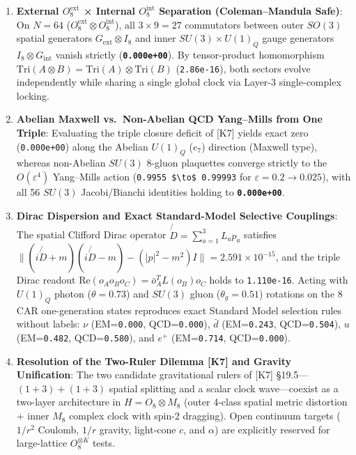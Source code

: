 \documentclass[
  a4paper,
]{article}
\providecommand{\tightlist}{%
  \setlength{\itemsep}{0pt}\setlength{\parskip}{0pt}}
\begin{document}
\begin{enumerate}
\def\labelenumi{\arabic{enumi}.}
\tightlist
\item
  \textbf{External \(O_8^{\mathrm{ext}}\) × Internal
  \(O_8^{\mathrm{int}}\) Separation (Coleman--Mandula Safe)}: On
  \(N = 64\) (\(O_8^{\mathrm{ext}} \otimes O_8^{\mathrm{int}}\)), all
  \(3 \times 9 = 27\) commutators between outer \(SO(3)\) spatial
  generators \(G_{\mathrm{ext}}\otimes I_8\) and inner
  \(SU(3)\times U(1)_Q\) gauge generators
  \(I_8\otimes G_{\mathrm{int}}\) vanish strictly
  (\textbf{\texttt{0.000e+00}}). By tensor-product homomorphism
  \(\mathrm{Tri}(A\otimes B) = \mathrm{Tri}(A)\otimes\mathrm{Tri}(B)\)
  (\texttt{2.86e-16}), both sectors evolve independently while sharing a
  single global clock via Layer-3 single-complex locking.
\item
  \textbf{Abelian Maxwell vs.~Non-Abelian QCD Yang--Mills from One
  Triple}: Evaluating the triple closure deficit of {[}K7{]} yields
  exact zero (\texttt{0.000e+00}) along the Abelian \(U(1)_Q\) (\(e_7\))
  direction (Maxwell type), whereas non-Abelian \(SU(3)\) 8-gluon
  plaquettes converge strictly to the \(O(\varepsilon^4)\) Yang--Mills
  action (\texttt{0.9955\ \$\textbackslash{}to\$\ 0.99993} for
  \(\varepsilon = 0.2 \to 0.025\)), with all 56 \(SU(3)\) Jacobi/Bianchi
  identities holding to \textbf{\texttt{0.000e+00}}.
\item
  \textbf{Dirac Dispersion and Exact Standard-Model Selective
  Couplings}: The spatial Clifford Dirac operator
  \(\not{D} = \sum_{a=1}^3 L_a p_a\) satisfies
  \(\|(i\not{D}+m)(i\not{D}-m) - (|p|^2-m^2)I\| = 2.591\times 10^{-15}\),
  and the triple Dirac readout
  \(\mathrm{Re}(o_A o_B o_C) = \bar{o}_A^T L(o_B) o_C\) holds to
  \texttt{1.110e-16}. Acting with \(U(1)_Q\) photon (\(\theta=0.73\))
  and \(SU(3)\) gluon (\(\theta_g=0.51\)) rotations on the 8 CAR
  one-generation states reproduces exact Standard Model selection rules
  without labels: \(\nu\) (EM=\texttt{0.000}, QCD=\texttt{0.000}),
  \(\bar{d}\) (EM=\texttt{0.243}, QCD=\texttt{0.504}), \(u\)
  (EM=\texttt{0.482}, QCD=\texttt{0.580}), and \(e^+\)
  (EM=\texttt{0.714}, QCD=\texttt{0.000}).
\item
  \textbf{Resolution of the Two-Ruler Dilemma {[}K7{]} and Gravity
  Unification}: The two candidate gravitational rulers of {[}K7{]}
  §19.5---\((1+3)+(1+3)\) spatial splitting and a scalar clock
  wave---coexist as a two-layer architecture in \(H = O_8 \otimes M_8\)
  (outer 4-class spatial metric distortion + inner \(M_8\) complex clock
  with spin-2 dragging). Open continuum targets (\(1/r^2\) Coulomb,
  \(1/r\) gravity, light-cone \(c\), and \(\alpha\)) are explicitly
  reserved for large-lattice \(O_8^{\otimes K}\) tests.
\end{enumerate}
\end{document}
